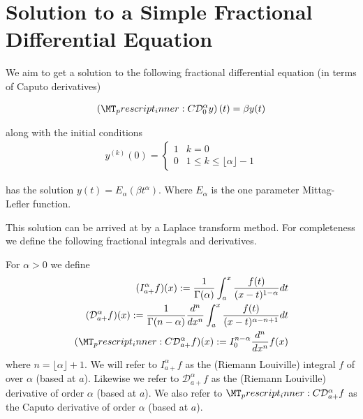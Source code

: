 \documentclass{unswmaths}
\begin{document}
\section*{Solution to a Simple Fractional Differential Equation}

We aim to get a solution to the following fractional differential equation (in terms of Caputo derivatives)

\begin{align}
	\label{eq:fde-1}
	\left( \prescript{C}{}{\mathcal{D}_0^\alpha}y \right)(t) = \beta y(t) 
\end{align}

along with the initial conditions 
\begin{align}
	\label{eq:fde-1-ic}
	y^{(k)}(0) = 
	\begin{cases}
		1 & k = 0 \\
		0 & 1 \leq k \leq \lfloor\alpha \rfloor - 1  
	\end{cases}
\end{align}

has the solution $ y(t) = E_\alpha \left( \beta t^\alpha \right) $. Where $ E_\alpha $ is the one parameter Mittag-Lefler function.

This solution can be arrived at by a Laplace transform method. For completeness we define the following fractional
integrals and derivatives.

\begin{definition}
	For $ \alpha > 0 $ we define
	\begin{align*}
		(I_{a+}^{\alpha}f)(x) := \frac{1}{\Gamma(\alpha)}\int_a^x \frac{f(t)}{(x-t)^{1 - \alpha}} dt \\
		(\mathcal{D}_{a+}^{\alpha}f)(x) := \frac{1}{\Gamma(n-\alpha)} \frac{d^n}{dx^n}\int_a^x \frac{f(t)}{(x-t)^{\alpha - n + 1}} dt \\
		(\prescript{C}{}{\mathcal{D}}_{a+}^\alpha f)(x) := I_{0}^{n-\alpha} \frac{d^n}{dx^n}f(x) 
	\end{align*}
	where $ n  = \lfloor \alpha \rfloor + 1$.
	We will refer to $ I_{a+}^\alpha f$ as the (Riemann Louiville) integral $ f $ of over $ \alpha $ (based at $ a $).
	Likewise we refer to $ \mathcal{D}_{a+}^\alpha f $ as the (Riemann Louiville) derivative of order $ \alpha $ (based at $ a $).
	We also refer to $ \prescript{C}{}{\mathcal{D}}_{a+}^\alpha f $ as the Caputo derivative of order $ \alpha $ (based at $ a $).
	
\end{definition}
\end{document}
